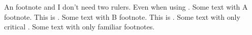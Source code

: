 \documentclass[]{article}
\begin{document}
\beginnumbering
\pstart
An footnote
and I don't need two rulers. Even when using .
\pend
\newpage
\pstart
Some text with A footnote. This is .
\pend
\newpage
\pstart
Some text with B footnote. This is .
\pend
\newpage
\pstart
Some text with only critical .
\pend
\newpage
\pstart
Some text with only familiar footnotes.
\pend
\endnumbering
\end{document}
